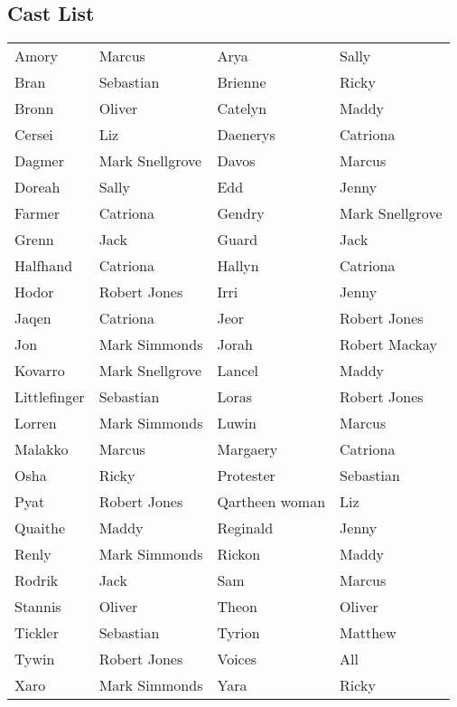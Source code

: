 \subsection*{Cast List}
\begin{tabular}{ll|ll}\\
Amory & Marcus &  Arya & Sally\\
Bran & Sebastian &  Brienne & Ricky\\
Bronn & Oliver &  Catelyn & Maddy\\
Cersei & Liz &  Daenerys & Catriona\\
Dagmer & Mark Snellgrove &  Davos & Marcus\\
Doreah & Sally &  Edd & Jenny\\
Farmer & Catriona &  Gendry & Mark Snellgrove\\
Grenn & Jack &  Guard & Jack\\
Halfhand & Catriona &  Hallyn & Catriona\\
Hodor & Robert Jones &  Irri & Jenny\\
Jaqen & Catriona &  Jeor & Robert Jones\\
Jon & Mark Simmonds &  Jorah & Robert Mackay\\
Kovarro & Mark Snellgrove &  Lancel & Maddy\\
Littlefinger & Sebastian &  Loras & Robert Jones\\
Lorren & Mark Simmonds &  Luwin & Marcus\\
Malakko & Marcus &  Margaery & Catriona\\
Osha & Ricky &  Protester & Sebastian\\
Pyat & Robert Jones &  Qartheen woman & Liz\\
Quaithe & Maddy &  Reginald & Jenny\\
Renly & Mark Simmonds &  Rickon & Maddy\\
Rodrik & Jack &  Sam & Marcus\\
Stannis & Oliver &  Theon & Oliver\\
Tickler & Sebastian &  Tyrion & Matthew\\
Tywin & Robert Jones &  Voices & All\\
Xaro & Mark Simmonds &  Yara & Ricky\\
\end{tabular}

